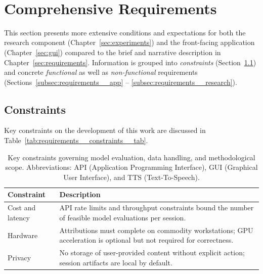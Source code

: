 \begin{appendices}
    \listofappendices
    \newpage \ \null\thispagestyle{empty}\newpage

    \chapter{Comprehensive Requirements}
    \label{app:requirements}

    This section presents more extensive conditions and expectations for both the research component (Chapter~\ref{sec:experiments}) and the front-facing application (Chapter~\ref{sec:gui}) compared to the brief and narrative description in Chapter~\ref{sec:requirements}. Information is grouped into \textit{constraints} (Section~\ref{subsec:requirements__constraints}) and concrete \textit{functional} as well as \textit{non-functional} requirements (Sections~\ref{subsec:requirements__app} --  \ref{subsec:requirements__research}).

    \section{Constraints}
    \label{subsec:requirements__constraints}

    Key constraints on the development of this work are discussed in Table~\ref{tab:requirements__constraints__tab}.

    \begin{table}[htbp]
    \renewcommand{\arraystretch}{1.1}
    \centering
    \caption{Key constraints governing model evaluation, data handling, and methodological scope. Abbreviations: API (Application Programming Interface), GUI (Graphical User Interface), and TTS (Text-To-Speech).}
    \begin{tabular}{p{2.5cm} p{11.5cm}}

    \toprule

    \textbf{Constraint} & \textbf{Description} \\

    \midrule

    Cost and latency & API rate limits and throughput constraints bound the number of feasible model evaluations per session. \\

    Hardware & Attributions must complete on commodity workstations; GPU acceleration is optional but not required for correctness. \\

    Privacy & No storage of user-provided content without explicit action; session artifacts are local by default. \\


\end{tabular}
\end{table}
\end{appendices}
